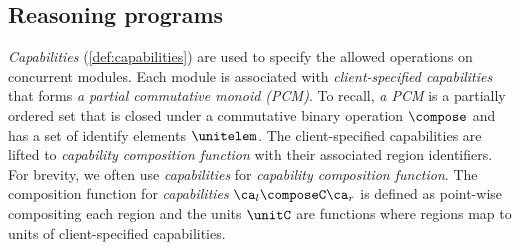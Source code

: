 \subsection{Reasoning programs}

\emph{Capabilities} (\cref{def:capabilities}) are used to specify the allowed operations on concurrent modules.
Each module is associated with \emph{client-specified capabilities} that forms \emph{a partial commutative monoid (PCM)}.
To recall, \emph{a PCM} is a partially ordered set that is closed under a commutative binary operation \( \compose \) and has a set of identify elements \( \unitelem \).
The client-specified capabilities are lifted to \emph{capability composition function} with their associated region identifiers.
For brevity, we often use \emph{capabilities} for \emph{capability composition function}.
The composition function for \emph{capabilities} \( \ca_l \composeC \ca_r \) is defined as point-wise compositing each region and the units \( \unitC \) are functions where regions map to units of client-specified capabilities.


